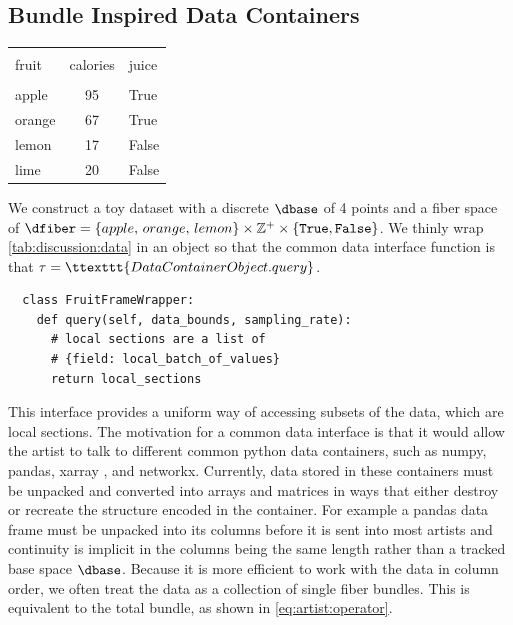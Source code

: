 \documentclass[10pt,journal,compsoc]{IEEEtran}
\theoremstyle{definition}
\theoremstyle{remark}
\begin{document}
\subsection{Bundle Inspired Data Containers}
\begin{table}[h!]
  \centering
\begin{tabular}{|lcl|}
  \hline \\
   fruit &  calories &  juice \\
  \hline\\
    apple &        95 &   True \\ 
   orange &        67 &   True \\ 
  lemon &        17 &  False \\ 
      lime &        20 &  False \\
  \hline
\end{tabular}
\label{tab:discussion:data}
\end{table}
We construct a toy dataset with a discrete $\dbase$ of 4 points and a fiber space of $\dfiber=\{apple,\, orange,\, lemon\}\times \mathbb{Z}^{+} \times \{\texttt{True}, \texttt{False}\}$. We thinly wrap \autoref{tab:discussion:data} in an object so that the common data interface function is that $\tau = \ttexttt{DataContainerObject.query}$. 
\begin{verbatim}
  class FruitFrameWrapper:
    def query(self, data_bounds, sampling_rate):
      # local sections are a list of
      # {field: local_batch_of_values}
      return local_sections
\end{verbatim}

This interface provides a uniform way of accessing subsets of the data, which are local sections. The motivation for a common data interface is that it would allow the artist to talk to different common python data containers, such as numpy\cite{harris2020array}, pandas\cite{jeff_reback_2020_3715232}, xarray \cite{hoyer2017xarray}, and networkx\cite{HagbergExploringNetwork2008}. Currently, data stored in these containers must be unpacked and converted into arrays and matrices in ways that either destroy or recreate the structure encoded in the container. For example a pandas data frame must be unpacked into its columns before it is sent into most artists and continuity is implicit in the columns being the same length rather than a tracked base space $\dbase$. Because it is more efficient to work with the data in column order, we often treat the data as a collection of single fiber bundles. This is equivalent to the total bundle, as shown in \autoref{eq:artist:operator}. 
\end{document}
